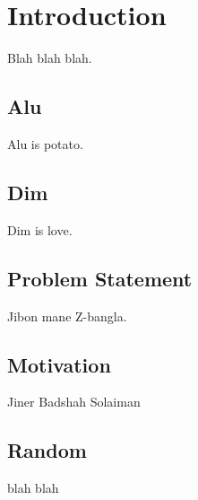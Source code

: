 \chapter{Introduction}

Blah blah blah.


\section{Alu}
Alu is potato.



\section{Dim}
Dim is love.




\section{Problem Statement}

Jibon mane Z-bangla.


\section{Motivation}
Jiner Badshah Solaiman


\section{Random}
blah blah \cite{DeepGlobe18}